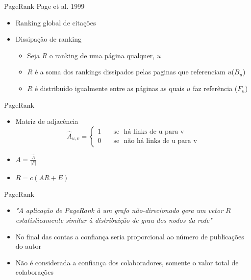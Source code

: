 \documentclass{beamer}
\begin{document}
\begin{frame}{PageRank}
  {Page et al. 1999}

  \begin{itemize}
    \item Ranking global de citações
    \item Dissipação de ranking 
    \begin{itemize}
      \item Seja $R$ o ranking de uma página qualquer, $u$
      \item $R$ é a soma dos rankings dissipados pelas paginas que referenciam $u$($B_u$)
      \item $R$ é distribuído igualmente entre as páginas as quais $u$ faz referência ($F_u$)
    \end{itemize}
  \end{itemize}
\end{frame}

\begin{frame}{PageRank}{}

  \begin{itemize}
    \item Matriz de adjacência
    \begin{equation} \label{eqn:adjacency-matrix}
      \hat{A}_{u,v} =
       \begin{cases}
         1       & \quad \text{se } \text{ há links de u para v}\\
         0       & \quad \text{se } \text{ não há links de u para v}
       \end{cases}
   \end{equation}
   \item $A = \frac {\hat{A}} {|F|}$
   \item $R = c(AR + E)$
  \end{itemize}
\end{frame}

\begin{frame}{PageRank}{}

  \begin{itemize}
    \item \textit{"A aplicação de PageRank à um grafo não-direcionado gera um vetor $R$ estatisticamente similar à distribuição de grau dos nodos da rede"}
    \item No final das contas a confiança seria proporcional ao número de publicações do autor
    \item Não é considerada a confiança dos colaboradores, somente o valor total de colaborações
  \end{itemize}
\end{frame}
\end{document}
